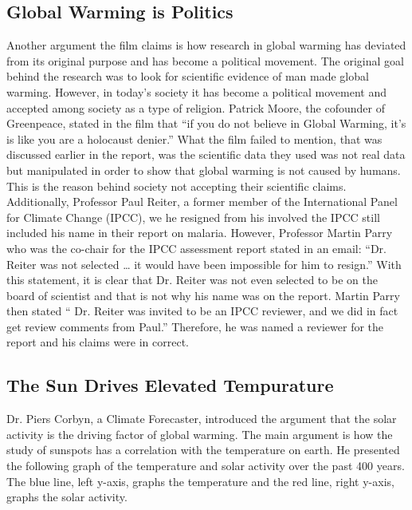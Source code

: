 \documentclass[12pt]{article}
\begin{document}
\subsection{Global Warming is Politics}	
	
Another argument the film claims is how research in global warming has deviated from its original purpose and has become a political movement. The original goal behind the research was to look for scientific evidence of man made global warming. However, in today’s society it has become a political movement and accepted among society as a type of religion. Patrick Moore, the cofounder of Greenpeace, stated in the film that “if you do not believe in Global Warming, it’s is like you are a holocaust denier.” What the film failed to mention, that was discussed earlier in the report, was the scientific data they used was not real data but manipulated in order to show that global warming is not caused by humans. This is the reason behind society not accepting their scientific claims.\\  

Additionally, Professor Paul Reiter, a former member of the International Panel for Climate Change (IPCC), we he resigned from his involved the IPCC still included his name in their report on malaria. However, Professor Martin Parry who was the co-chair for the IPCC assessment report stated in an email: “Dr. Reiter was not selected … it would have been impossible for him to resign.” With this statement, it is clear that Dr. Reiter was not even selected to be on the board of scientist and that is not why his name was on the report. Martin Parry then stated “ Dr. Reiter was invited to be an IPCC reviewer, and we did in fact get review comments from Paul.” Therefore, he was named a reviewer for the report and his claims were in correct.\\

\subsection{The Sun Drives Elevated Tempurature}

Dr. Piers Corbyn, a Climate Forecaster, introduced the argument that the solar activity is the driving factor of global warming. The main argument is how the study of sunspots has a correlation with the temperature on earth. He presented the following graph of the temperature and solar activity over the past 400 years. The blue line, left y-axis, graphs the temperature and the red line, right y-axis, graphs the solar activity.   \\
\end{document}
